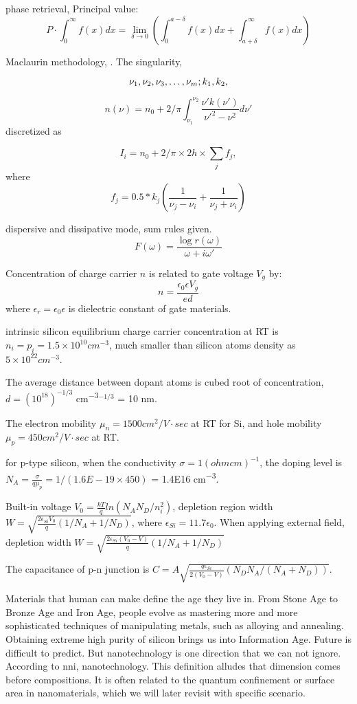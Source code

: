phase retrieval, 
Principal value:
\[
P\cdot\int_0^\infty f(x)dx = \lim_{\delta\rightarrow 0} (\int_0^{a-\delta} f(x)dx + \int_{a+\delta}^\infty f(x)dx)
\]

Maclaurin methodology, \cite{Rocha2014}. The singularity, 

\[
\nu_1, \nu_2, \nu_3, \ldots, \nu_m;\\
k_1,k_2,
\]

\[
n(\nu) = n_0 + 2/\pi \int_{\nu_1}^{\nu_2} \frac{\nu' k(\nu')}{\nu'^2 - \nu^2} d\nu'
\]
discretized as

\[
I_i = n_0 + 2/\pi \times 2h \times \sum_j f_j,
\]
where
\[
f_j = 0.5*k_j (\frac{1}{\nu_j - \nu_i} + \frac{1}{\nu_j + \nu_i})
\]

dispersive and dissipative mode, sum rules given. \cite{King1979}
\[
F(\omega) = \frac{\log r(\omega)}{\omega + i\omega'}
\]



Concentration of charge carrier $n$ is related to gate voltage $V_g$ by:
\[
n = \frac{\epsilon_0 \epsilon V_g}{ed}
\]
where $\epsilon_r = \epsilon_0 \epsilon$ is dielectric constant of gate materials.

intrinsic silicon equilibrium charge carrier concentration at RT is $n_i = p_i = 1.5 \times 10^{10} cm^{-3}$, much smaller than silicon atoms density as $5\times 10 ^{22} cm^{-3}$.

The average distance between dopant atoms is cubed root of concentration, $d = (10^{18})^{-1/3}$ \si{cm^{-3}}$^{-1/3}$ = 10 nm.

The electron mobility $\mu_n = 1500 cm^2/V\cdot sec $ at RT for Si, and hole mobility $\mu_p = 450 cm^2/V\cdot sec$ at RT.

for p-type silicon, when the conductivity $\sigma = 1 (ohm cm )^{-1}$, the doping level is
$N_A = \frac{\sigma}{q \mu_p}= 1 / (1.6E-19 \times 450)$ = 1.4E16 \si{cm^{-3}}.

Built-in voltage $V_0 = \frac{kT}{q}ln(N_A N_D/n_i^2)$, depletion region width $W = \sqrt{\frac{2 \epsilon_{Si} V_0}{q}(1/N_A + 1/N_D)}$, where $\epsilon_{Si} = 11.7 \epsilon_0$. When applying external field, depletion width $W = \sqrt{\frac{2 \epsilon_{Si} (V_0 - V) }{q}(1/N_A + 1/N_D)}$

The capacitance of p-n junction is $C = A \sqrt{\frac{q \epsilon_{Si}}{2(V_0 -V)}(N_D N_A/(N_A + N_D))}$.



\iffalse
Materials that human can make define the age they live in. From Stone Age to Bronze Age and Iron Age, people evolve as mastering more and more sophisticated techniques of manipulating metals, such as alloying and annealing. Obtaining extreme high purity of silicon brings us into Information Age. Future is difficult to predict. But nanotechnology is one direction that we can not ignore. According to \gls{nni}, \gls{nanotechnology}. This definition alludes that dimension comes before compositions. It is often related to the quantum confinement or surface area in nanomaterials, which we will later revisit with specific scenario.

